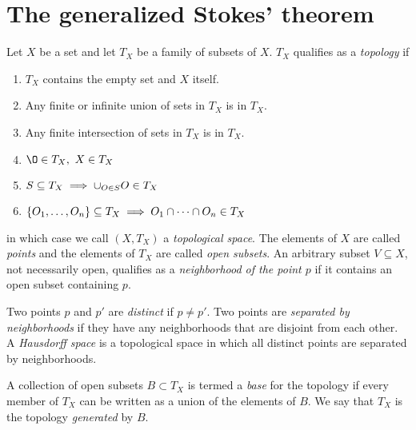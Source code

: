 \documentclass[11pt]{article}
\numberwithin{equation}{section}
\begin{document}
\newpage
\section{The generalized Stokes' theorem}

\begin{dfn}
Let $X$ be a set and let $T_X$ be a family of subsets of $X$.
$T_X$ qualifies as a \textit{topology} if
\begin{multicols}{2}%
\begin{enumerate}
\item
  $T_X$ contains the empty set and $X$ itself.
\item
  Any finite or infinite union of sets in $T_X$ is in $T_X$.
\item
  Any finite intersection of sets in $T_X$ is in $T_X$.
\setcounter{enumi}{0}
\item[]
  $\O\in T_X,\ X\in T_X$
\item[]
  ${\displaystyle
    S
  \subseteq
    T_X
  \implies
    \cup_{O\in S}
    O
  \in
    T_X
  }$
\item[]
  $
    \{O_1,\ldots,O_n\}
  \subseteq
    T_X
  \implies
    O_1\cap\cdots\cap O_n
  \in
    T_X
  $
\end{enumerate}%
\end{multicols}%
\noindent
in which case we call $(X,T_X)$ a \textit{topological space}.
The elements of $X$ are called \textit{points} and the elements of $T_X$ are called \textit{open subsets}.
An arbitrary subset $V\subseteq X$, not necessarily open, qualifies as a \textit{neighborhood of the point $p$} if it contains an open subset containing $p$.\footnotemark
{}
\end{dfn}

\begin{dfn}
Two points $p$ and $p'$ are \textit{distinct} if $p\neq p'$.
Two points are \textit{separated by neighborhoods} if they have any neighborhoods that are disjoint from each other.
A \textit{Hausdorff space} is a topological space in which all distinct points are separated by neighborhoods.
\end{dfn}

\begin{dfn}
A collection of open subsets $B\subset T_X$ is termed a \textit{base} for the topology if every member of $T_X$ can be written as a union of the elements of $B$.
We say that $T_X$ is the topology \textit{generated} by $B$.
\end{dfn}
\end{document}
